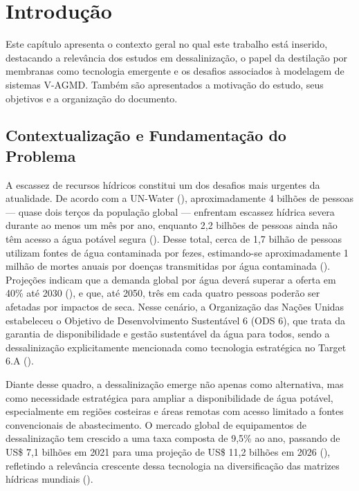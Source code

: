 \chapter{Introdução}

Este capítulo apresenta o contexto geral no qual este trabalho está inserido, destacando a relevância dos estudos em dessalinização, o papel da destilação por membranas como tecnologia emergente e os desafios associados à modelagem de sistemas V-AGMD. Também são apresentados a motivação do estudo, seus objetivos e a organização do documento.

\section{Contextualização e Fundamentação do Problema}

A escassez de recursos hídricos constitui um dos desafios mais urgentes da atualidade. De acordo com a UN-Water (\cite{UNWater2024}), aproximadamente 4 bilhões de pessoas — quase dois terços da população global — enfrentam escassez hídrica severa durante ao menos um mês por ano, enquanto 2,2 bilhões de pessoas ainda não têm acesso a água potável segura (\cite{WHO2023}). Desse total, cerca de 1,7 bilhão de pessoas utilizam fontes de água contaminada por fezes, estimando-se aproximadamente 1 milhão de mortes anuais por doenças transmitidas por água contaminada (\cite{WHO2023}). Projeções indicam que a demanda global por água deverá superar a oferta em 40\% até 2030 (\cite{IDRA2026}), e que, até 2050, três em cada quatro pessoas poderão ser afetadas por impactos de seca. Nesse cenário, a Organização das Nações Unidas estabeleceu o Objetivo de Desenvolvimento Sustentável 6 (ODS 6), que trata da garantia de disponibilidade e gestão sustentável da água para todos, sendo a dessalinização explicitamente mencionada como tecnologia estratégica no Target 6.A (\cite{UNSDG6}).

Diante desse quadro, a dessalinização emerge não apenas como alternativa, mas como necessidade estratégica para ampliar a disponibilidade de água potável, especialmente em regiões costeiras e áreas remotas com acesso limitado a fontes convencionais de abastecimento. O mercado global de equipamentos de dessalinização tem crescido a uma taxa composta de 9,5\% ao ano, passando de US\$ 7,1 bilhões em 2021 para uma projeção de US\$ 11,2 bilhões em 2026 (\cite{IDRA2026}), refletindo a relevância crescente dessa tecnologia na diversificação das matrizes hídricas mundiais (\cite{Elimelech2011,Shannon2008,Shemer2023}).

